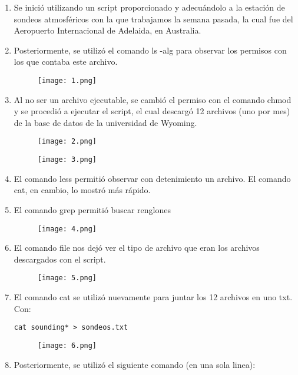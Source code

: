 \documentclass[a4paper]{article}
\begin{document}
\begin{enumerate}
\item Se inició utilizando un script proporcionado y adecuándolo a la estación de sondeos atmosféricos con la que trabajamos la semana pasada, la cual fue del Aeropuerto Internacional de Adelaida, en Australia.
\item Posteriormente, se utilizó el comando ls -alg para observar los permisos con los que contaba este archivo. 
\begin{figure}[h!]
  \texttt{[image: 1.png]}
  \centering
  \label{fig:1}
\end{figure}
\item Al no ser un archivo ejecutable, se cambió el permiso con el comando chmod y se procedió a ejecutar el script, el cual descargó 12 archivos (uno por mes) de la base de datos de la universidad de Wyoming. 
\begin{figure}[h!]
  \texttt{[image: 2.png]}
  \centering
  \label{fig:2}
\end{figure}
\begin{figure}[h!]
  \texttt{[image: 3.png]}
  \centering
  \label{fig:3}
\end{figure}
\item El comando less permitió observar con detenimiento un archivo. El comando cat, en cambio, lo mostró más rápido. 
\item El comando grep permitió buscar renglones
\begin{figure}[h!]
  \texttt{[image: 4.png]}
  \centering
  \label{fig:4}
\end{figure}
\item El comando file nos dejó ver el tipo de archivo que eran los archivos descargados con el script.
\begin{figure}[h!]
  \texttt{[image: 5.png]}
  \centering
  \label{fig:5}
\end{figure}
\item El comando cat se utilizó nuevamente para juntar los 12 archivos en uno txt. Con:
\begin{verbatim}
cat sounding* > sondeos.txt
\end{verbatim}
\begin{figure}[h!]
  \texttt{[image: 6.png]}
  \centering
  \label{fig:6}
\end{figure}
\item Posteriormente, se utilizó el siguiente comando (en una sola linea): 
 \begin{verbatim}

\end{verbatim}
\end{enumerate}
\end{document}
